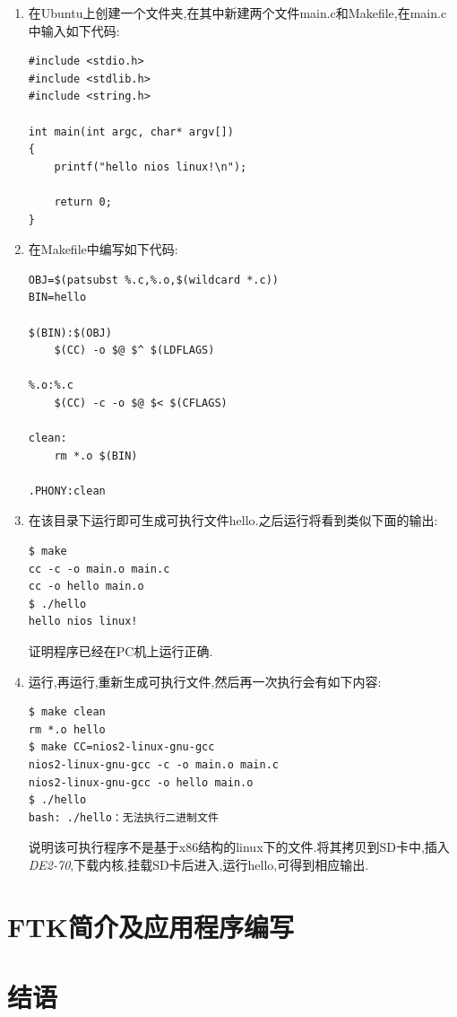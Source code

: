 \documentclass[12pt,a4paper,titlepage]{article}
\begin{document}
\begin{enumerate}
\item 在Ubuntu上创建一个文件夹,在其中新建两个文件main.c和Makefile,在main.c中输入如下代码:
\begin{verbatim}
#include <stdio.h>
#include <stdlib.h>
#include <string.h>

int main(int argc, char* argv[])
{
    printf("hello nios linux!\n");

    return 0;
}
\end{verbatim}
\item 在Makefile中编写如下代码:
\begin{verbatim}
OBJ=$(patsubst %.c,%.o,$(wildcard *.c))
BIN=hello

$(BIN):$(OBJ)
    $(CC) -o $@ $^ $(LDFLAGS)

%.o:%.c
    $(CC) -c -o $@ $< $(CFLAGS)

clean:
    rm *.o $(BIN)

.PHONY:clean
\end{verbatim}
\item 在该目录下运行即可生成可执行文件hello.之后运行将看到类似下面的输出:
\begin{verbatim}
$ make
cc -c -o main.o main.c 
cc -o hello main.o 
$ ./hello 
hello nios linux!
\end{verbatim}
证明程序已经在PC机上运行正确.
\item 运行,再运行,重新生成可执行文件,然后再一次执行会有如下内容:
\begin{verbatim}
$ make clean
rm *.o hello
$ make CC=nios2-linux-gnu-gcc
nios2-linux-gnu-gcc -c -o main.o main.c 
nios2-linux-gnu-gcc -o hello main.o 
$ ./hello 
bash: ./hello：无法执行二进制文件
\end{verbatim}
说明该可执行程序不是基于x86结构的linux下的文件.将其拷贝到SD卡中,插入\textit{DE2-70},下载内核,挂载SD卡后进入,运行hello,可得到相应输出.
\end{enumerate}
\setcounter{footnote}{0}
\newpage{}
\section{FTK简介及应用程序编写}
\setcounter{footnote}{0}
\newpage{}
\section{结语}
\end{document}
